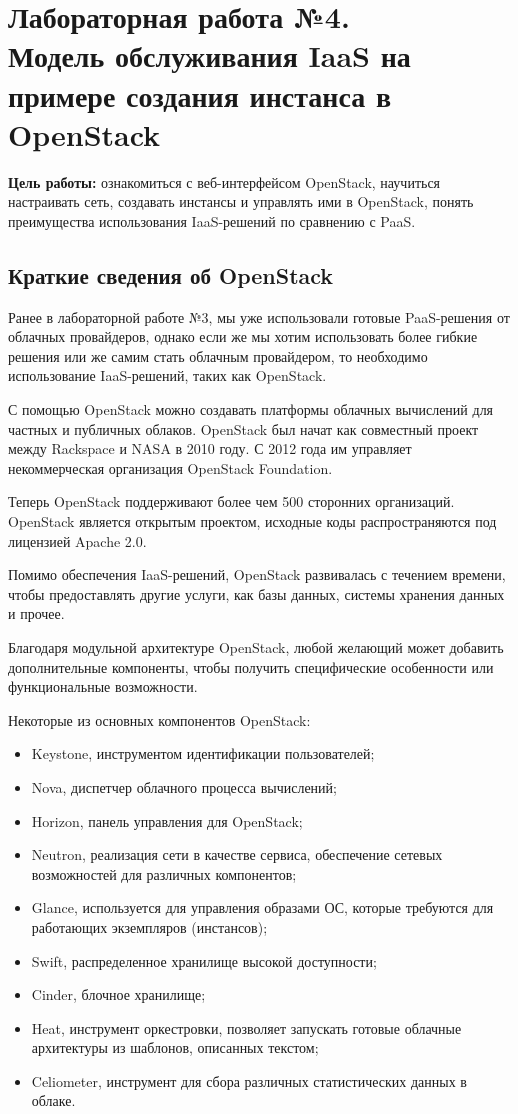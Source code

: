 \section[ЛР №4. Модель обслуживания IaaS, OpenStack]{Лабораторная работа №4. \\
Модель обслуживания IaaS на примере создания инстанса в OpenStack}

\textbf{Цель работы:} ознакомиться с веб-интерфейсом OpenStack, научиться настраивать сеть, создавать инстансы и управлять ими в OpenStack, понять преимущества использования IaaS-решений по сравнению с PaaS.

\subsection{Краткие сведения об OpenStack}

Ранее в лабораторной работе №3, мы уже использовали готовые PaaS-решения от облачных провайдеров, однако если же мы хотим использовать более гибкие решения или же самим стать облачным провайдером, то необходимо использование IaaS-решений, таких как OpenStack.

С помощью OpenStack можно создавать платформы облачных вычислений для частных и публичных облаков.
OpenStack был начат как совместный проект между Rackspace и NASA в 2010 году.
С 2012 года им управляет некоммерческая организация OpenStack Foundation.

Теперь OpenStack поддерживают более чем 500 сторонних организаций.
OpenStack является открытым проектом, исходные коды распространяются под лицензией Apache 2.0.

Помимо обеспечения IaaS-решений, OpenStack развивалась с течением времени, чтобы предоставлять другие услуги, как базы данных, системы хранения данных и прочее.

Благодаря модульной архитектуре OpenStack, любой желающий может добавить дополнительные компоненты, чтобы получить специфические особенности или функциональные возможности.

Некоторые из основных компонентов OpenStack:
\begin{itemize}
    \item Keystone, инструментом идентификации пользователей;
    \item Nova, диспетчер облачного процесса вычислений;
    \item Horizon, панель управления для OpenStack;
    \item Neutron, реализация сети в качестве сервиса, обеспечение сетевых возможностей для различных компонентов;
    \item Glance, используется для управления образами ОС, которые требуются для работающих экземпляров (инстансов);
    \item Swift, распределенное хранилище высокой доступности;
    \item Cinder, блочное хранилище;
    \item Heat, инструмент оркестровки, позволяет запускать готовые облачные архитектуры из шаблонов, описанных текстом;
    \item Celiometer, инструмент для сбора различных статистических данных в облаке.
\end{itemize}

